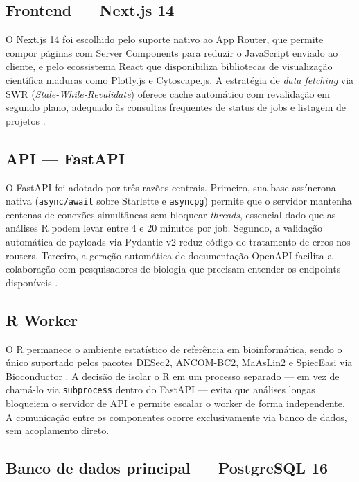 
\subsection{Frontend — Next.js 14}

O Next.js 14 foi escolhido pelo suporte nativo ao App Router, que
permite compor páginas com Server Components para reduzir o JavaScript
enviado ao cliente, e pelo ecossistema React que disponibiliza
bibliotecas de visualização científica maduras como Plotly.js e
Cytoscape.js. A estratégia de \textit{data fetching} via SWR
(\textit{Stale-While-Revalidate}) oferece cache automático com
revalidação em segundo plano, adequado às consultas frequentes de
status de jobs e listagem de projetos \cite{vercel2023nextjs}.

\subsection{API — FastAPI}

O FastAPI foi adotado por três razões centrais. Primeiro, sua base
assíncrona nativa (\texttt{async/await} sobre Starlette e
\texttt{asyncpg}) permite que o servidor mantenha centenas de conexões
simultâneas sem bloquear \textit{threads}, essencial dado que as
análises R podem levar entre 4 e 20 minutos por job. Segundo, a
validação automática de payloads via Pydantic v2 reduz código de
tratamento de erros nos routers. Terceiro, a geração automática de
documentação OpenAPI facilita a colaboração com pesquisadores de
biologia que precisam entender os endpoints disponíveis
\cite{fastapi2023docs}.

\subsection{R Worker}

O R permanece o ambiente estatístico de referência em bioinformática,
sendo o único suportado pelos pacotes DESeq2, ANCOM-BC2, MaAsLin2 e
SpiecEasi via Bioconductor \cite{huber2015orchestrating}. A decisão de
isolar o R em um processo separado — em vez de chamá-lo via
\texttt{subprocess} dentro do FastAPI — evita que análises longas
bloqueiem o servidor de API e permite escalar o worker de forma
independente. A comunicação entre os componentes ocorre exclusivamente
via banco de dados, sem acoplamento direto.

\subsection{Banco de dados principal — PostgreSQL 16}

